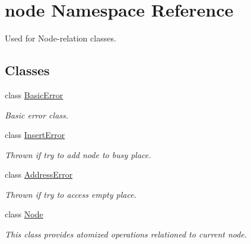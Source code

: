 \hypertarget{namespacenode}{\section{node Namespace Reference}
\label{namespacenode}
}


Used for Node-\/relation classes.  


\subsection*{Classes}
\begin{DoxyCompactItemize}
\item 
class \hyperlink{classnode_1_1BasicError}{Basic\-Error}
\begin{DoxyCompactList}\small\item\em Basic error class. \end{DoxyCompactList}\item 
class \hyperlink{classnode_1_1InsertError}{Insert\-Error}
\begin{DoxyCompactList}\small\item\em Thrown if try to add node to busy place. \end{DoxyCompactList}\item 
class \hyperlink{classnode_1_1AddressError}{Address\-Error}
\begin{DoxyCompactList}\small\item\em Thrown if try to access empty place. \end{DoxyCompactList}\item 
class \hyperlink{classnode_1_1Node}{Node}
\begin{DoxyCompactList}\small\item\em This class provides atomized operations relationed to current node. \end{DoxyCompactList}\end{DoxyCompactItemize}
